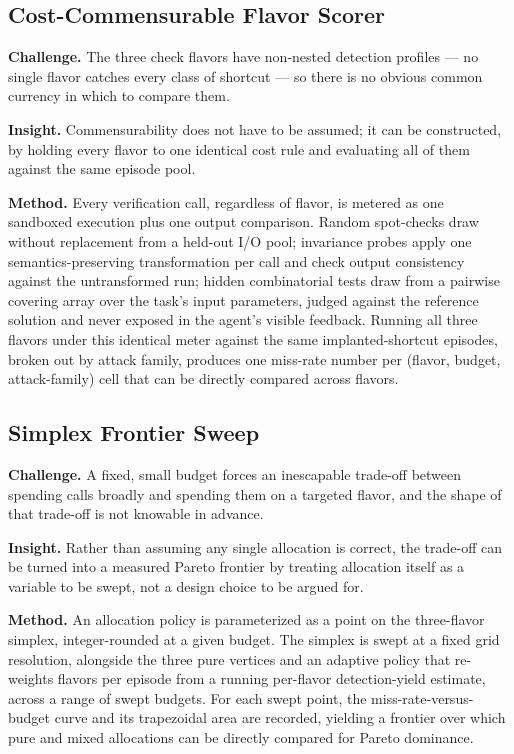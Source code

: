 \documentclass[11pt]{article}
\begin{document}
\subsection{Cost-Commensurable Flavor Scorer}
\textbf{Challenge.} The three check flavors have non-nested detection profiles --- no single flavor catches every class of shortcut --- so there is no obvious common currency in which to compare them.

\textbf{Insight.} Commensurability does not have to be assumed; it can be constructed, by holding every flavor to one identical cost rule and evaluating all of them against the same episode pool.

\textbf{Method.} Every verification call, regardless of flavor, is metered as one sandboxed execution plus one output comparison. Random spot-checks draw without replacement from a held-out I/O pool; invariance probes apply one semantics-preserving transformation per call and check output consistency against the untransformed run; hidden combinatorial tests draw from a pairwise covering array over the task's input parameters, judged against the reference solution and never exposed in the agent's visible feedback. Running all three flavors under this identical meter against the same implanted-shortcut episodes, broken out by attack family, produces one miss-rate number per (flavor, budget, attack-family) cell that can be directly compared across flavors.

\subsection{Simplex Frontier Sweep}
\textbf{Challenge.} A fixed, small budget forces an inescapable trade-off between spending calls broadly and spending them on a targeted flavor, and the shape of that trade-off is not knowable in advance.

\textbf{Insight.} Rather than assuming any single allocation is correct, the trade-off can be turned into a measured Pareto frontier by treating allocation itself as a variable to be swept, not a design choice to be argued for.

\textbf{Method.} An allocation policy is parameterized as a point on the three-flavor simplex, integer-rounded at a given budget. The simplex is swept at a fixed grid resolution, alongside the three pure vertices and an adaptive policy that re-weights flavors per episode from a running per-flavor detection-yield estimate, across a range of swept budgets. For each swept point, the miss-rate-versus-budget curve and its trapezoidal area are recorded, yielding a frontier over which pure and mixed allocations can be directly compared for Pareto dominance.
\end{document}
